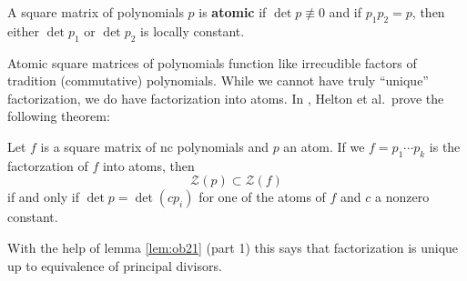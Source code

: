 \begin{definition}[Atomic]
  A square matrix of polynomials \(p\) is \textbf{atomic} if
  \(\det p \not\equiv 0\) and if \(p_1p_2=p\), then either \(\det p_1\) or
  \(\det p_2\) is locally constant.
\end{definition}

Atomic square matrices of polynomials function like irrecudible factors of
tradition (commutative) polynomials. While we cannot have truly ``unique''
factorization, we do have factorization into atoms. In
\cite{heltonFactorization2019}, Helton et al.\ prove the following theorem:

\begin{theorem}
  Let \(f\) is a square matrix of nc polynomials and \(p\) an atom. If we
  \(f = p_1 \cdots p_k\) is the factorzation of \(f\) into atoms, then
  \[
    \mathscr{Z}(p) \subset \mathscr{Z}(f)
  \]
  if and only if \(\det p = \det (c p_i)\) for one of the atoms of \(f\) and
  \(c\) a nonzero constant.
\end{theorem}

With the help of lemma \ref{lem:ob21} (part 1) this says that factorization is
unique up to equivalence of principal divisors.
